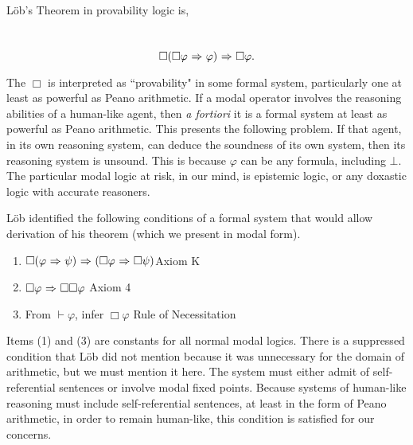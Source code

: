 L\"ob's Theorem in provability logic is,
\begin{center}~\label{lob}
	\begin{equation}
	\Box(\Box\varphi {\ \Rightarrow \ } \varphi){\ \Rightarrow \ } \Box\varphi.
	\end{equation}
\end{center}
The $\Box$ is interpreted as ``provability" in some formal system, particularly one at least as powerful as Peano arithmetic. If a modal operator involves the reasoning abilities of a human-like agent, then \emph{a fortiori} it is a formal system at least as powerful as Peano arithmetic. This presents the following problem. If that agent, in its own reasoning system, can deduce the soundness of its own system, then its reasoning system is unsound. This is because $\varphi$ can be any formula, including $\bot$. The particular modal logic at risk, in our mind, is epistemic logic, or any doxastic logic with accurate reasoners.

L\"ob identified the following conditions of a formal system that would allow derivation of his theorem (which we present in modal form).
\begin{enumerate}
	\item $\Box(\varphi {\ \Rightarrow \ } \psi) {\ \Rightarrow \ } (\Box\varphi {\ \Rightarrow \ } \Box \psi)$\mbox{}\hfill Axiom K
	\item $\Box\varphi {\ \Rightarrow \ } \Box\Box\varphi$ \mbox{}\hfill Axiom 4
	\item From $\vdash \varphi$, infer $\Box\varphi$ \mbox{}\hfill Rule of Necessitation
\end{enumerate}

Items (1) and (3) are constants for all normal modal logics. There is a suppressed condition that L\"ob did not mention because it was unnecessary for the domain of arithmetic, but we must mention it here. The system must either admit of self-referential sentences or involve modal fixed points. Because systems of human-like reasoning must include self-referential sentences, at least in the form of Peano arithmetic, in order to remain human-like, this condition is satisfied for our concerns. 

